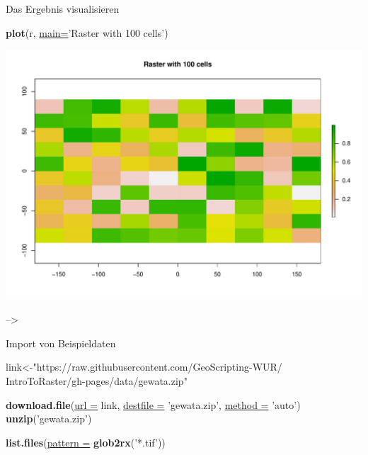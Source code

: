 \documentclass[ignorenonframetext,]{beamer}
\newenvironment{Shaded}{\begin{snugshade}}{\end{snugshade}}
\newcommand{\DataTypeTok}[1]{\textcolor[rgb]{0.74,0.68,0.62}{\underline{#1}}}
\newcommand{\KeywordTok}[1]{\textcolor[rgb]{0.26,0.66,0.93}{\textbf{#1}}}
\newcommand{\NormalTok}[1]{\textcolor[rgb]{0.74,0.68,0.62}{#1}}
\newcommand{\StringTok}[1]{\textcolor[rgb]{0.02,0.61,0.04}{#1}}
\begin{document}
\begin{frame}[fragile]{Das Ergebnis visualisieren}
\protect\hypertarget{das-ergebnis-visualisieren}{}

\begin{Shaded}
\begin{Highlighting}[]
\KeywordTok{plot}\NormalTok{(r, }\DataTypeTok{main=}\StringTok{'Raster with 100 cells'}\NormalTok{)}
\end{Highlighting}
\end{Shaded}

\includegraphics{A8_Rasterdaten_files/figure-beamer/unnamed-chunk-5-1.pdf}

--\textgreater{}

\end{frame}

\begin{frame}[fragile]{Import von Beispieldaten}
\protect\hypertarget{import-von-beispieldaten}{}

\begin{Shaded}
\begin{Highlighting}[]
\NormalTok{link<-}\StringTok{"https://raw.githubusercontent.com/GeoScripting-WUR/}
\StringTok{IntroToRaster/gh-pages/data/gewata.zip"}
\end{Highlighting}
\end{Shaded}

\begin{Shaded}
\begin{Highlighting}[]
\KeywordTok{download.file}\NormalTok{(}\DataTypeTok{url =}\NormalTok{ link, }\DataTypeTok{destfile =} \StringTok{'gewata.zip'}\NormalTok{, }
              \DataTypeTok{method =} \StringTok{'auto'}\NormalTok{)}
\KeywordTok{unzip}\NormalTok{(}\StringTok{'gewata.zip'}\NormalTok{)}
\end{Highlighting}
\end{Shaded}

\begin{Shaded}
\begin{Highlighting}[]
\KeywordTok{list.files}\NormalTok{(}\DataTypeTok{pattern =} \KeywordTok{glob2rx}\NormalTok{(}\StringTok{'*.tif'}\NormalTok{))}
\end{Highlighting}
\end{Shaded}

\end{frame}
\end{document}
